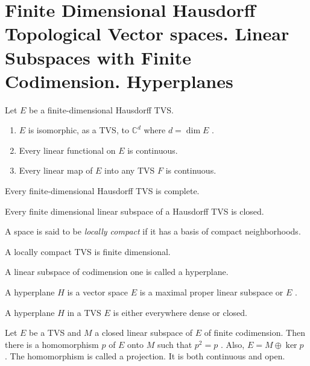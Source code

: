 \section{Finite Dimensional Hausdorff Topological Vector spaces. Linear Subspaces with Finite Codimension. Hyperplanes}

\begin{thm}
	Let $ E $ be a finite-dimensional Hausdorff TVS. 
	\begin{enumerate}
		\item $ E $ is isomorphic, as a TVS, to $ \mathbb{C}^{ d } $ where  $ d = \dim E $ .
		\item Every linear functional on $ E $ is continuous.
		\item Every linear map of $ E $ into any TVS $ F $ is continuous.
	\end{enumerate}
	
\end{thm}

\begin{cor}
	Every finite-dimensional Hausdorff TVS is complete.
\end{cor}

\begin{cor}
	Every finite dimensional linear subspace of a Hausdorff TVS is closed.
\end{cor}

A space is said to be \textit{locally compact} if it has a basis of compact neighborhoods.

\begin{thm}
	A locally compact TVS is finite dimensional.
\end{thm}

\begin{defn}
	A linear subspace of codimension one is called a hyperplane.
\end{defn}

\begin{prop}
	A hyperplane $ H $ is a vector space $ E $ is a maximal proper linear subspace or $ E $ .
\end{prop}

\begin{prop}
	A hyperplane $ H $ in a TVS $ E $ is either everywhere dense or closed.
\end{prop}

\begin{prop}
	Let $ E	 $ be a TVS and $ M $ a closed linear subspace of $ E $ of finite codimension. Then there is a homomorphism $ p $  of $ E $ onto $ M $ such that $ p^{ 2 } = p $ . Also, $ E = M \oplus \ker p $ . The homomorphism is called a projection. It is both continuous and open.
\end{prop}


